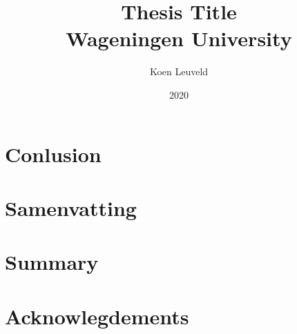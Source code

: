 \documentclass[12pt]{report}
\begin{document}

\title{
	{Thesis Title}\\
	{\large Wageningen University}\\
}
\author{Koen Leuveld}
\date{2020}
\maketitle



\tableofcontents




 



\chapter{Conlusion}


\clearpage
\chapter{Samenvatting}


\clearpage
\chapter{Summary}


\clearpage
\chapter{Acknowlegdements}




\end{document}
